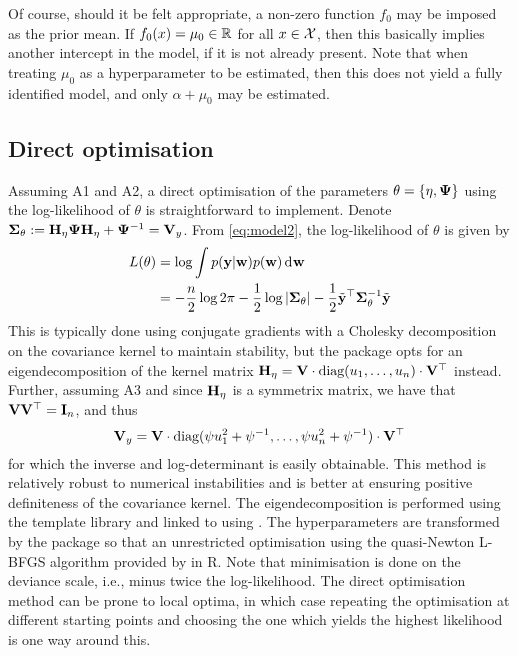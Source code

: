Of course, should it be felt appropriate, a non-zero function $f_0$ may be imposed as the prior mean.
If $f_0(x) = \mu_0 \in \bbR$ for all $x\in\cX$, then this basically implies another intercept in the model, if it is not already present.
Note that when treating $\mu_0$ as a hyperparameter to be estimated, then this does not yield a fully identified model, and only $\alpha +\mu_0$ may be estimated.


 



\subsection{Direct optimisation}

Assuming A1 and A2, a direct optimisation of the parameters $\theta=\{\eta,\bPsi \}$ using the log-likelihood of $\theta$ is straightforward to implement.
Denote $\bSigma_\theta := \bH_\eta\bPsi\bH_\eta + \bPsi^{-1} = \bV_y$.
From \eqref{eq:model2}, the log-likelihood of $\theta$ is given by
%
\begin{align*}
  L(\theta)
  &= \log \int p(\by|\bw)p(\bw) \dint \bw \\
  &= -\half[n]\log 2\pi - \half\log\vert \bSigma_\theta \vert - \half \tilde\by^\top \bSigma_\theta^{-1} \tilde\by
\end{align*}
%
This is typically done using conjugate gradients with a Cholesky decomposition on the covariance kernel to maintain stability, but the  package opts for an eigendecomposition of the kernel matrix $\bH_{\eta} = \bV\cdot\text{diag}(u_1,\dots,u_n)\cdot\bV^\top$ instead.
Further, assuming A3 and since $\bH_{\eta}$ is a symmetrix matrix, we have that $\bV\bV^\top = \bI_n$, and thus
%
\[
  \bV_y = \bV \cdot \text{diag} (\psi u_1^2 + \psi^{-1},\dots,\psi u_n^2 + \psi^{-1}) \cdot \bV^\top
\]
%
for which the inverse and log-determinant is easily obtainable.
This method is relatively robust to numerical instabilities and is better at ensuring positive definiteness of the covariance kernel.
The eigendecomposition is performed using the   template library and linked to  using  \citep{eddelbuettel2011rcpp}.
The hyperparameters are transformed by the  package so that an unrestricted optimisation using the quasi-Newton L-BFGS algorithm provided by  in \proglang R.
Note that minimisation is done on the deviance scale, i.e., minus twice the log-likelihood.
The direct optimisation method can be prone to local optima, in which case repeating the optimisation at different starting points and choosing the one which yields the highest likelihood is one way around this.

